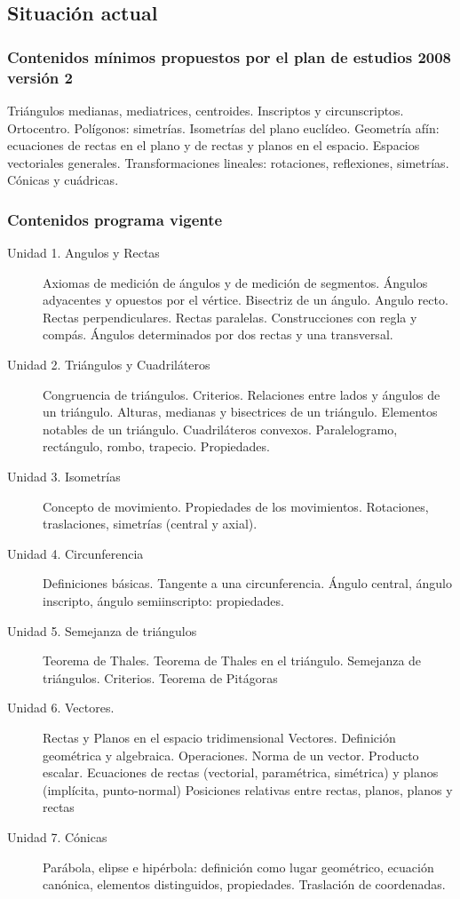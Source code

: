 \documentclass[a4paper,10pt,BCOR10mm,oneside,headsepline]{scrbook}
\begin{document}
\subsection{Situación actual}

\subsubsection{Contenidos mínimos propuestos por el plan de estudios 2008 versión 2}

Triángulos medianas, mediatrices, centroides. Inscriptos y
circunscriptos. Ortocentro. Polígonos: simetrías. Isometrías del
plano euclídeo. Geometría afín: ecuaciones de rectas  en
el plano y de rectas y planos en el espacio. Espacios vectoriales generales.
Transformaciones lineales: rotaciones, reflexiones, simetrías.
Cónicas y cuádricas.

\subsubsection{Contenidos programa vigente}

\begin{description}
 \item[Unidad 1. Angulos y Rectas]
Axiomas de medición de ángulos y de medición de segmentos. Ángulos
adyacentes y opuestos por el vértice. Bisectriz de un ángulo. Angulo recto.
Rectas perpendiculares. Rectas paralelas. Construcciones con regla y
compás. Ángulos determinados por dos rectas y una transversal.

 \item[Unidad 2. Triángulos y Cuadriláteros]
Congruencia de triángulos. Criterios. Relaciones entre lados y ángulos de
un triángulo.
Alturas, medianas y bisectrices de un triángulo. Elementos notables de un
triángulo.
Cuadriláteros convexos. Paralelogramo, rectángulo, rombo, trapecio.
Propiedades.

 \item[Unidad 3. Isometrías]
Concepto de movimiento. Propiedades de los movimientos. Rotaciones,
traslaciones, simetrías (central y axial).

 \item[Unidad 4. Circunferencia]
Definiciones básicas. Tangente a una circunferencia. Ángulo central,
ángulo inscripto, ángulo semiinscripto: propiedades.

 \item[Unidad 5. Semejanza de triángulos]
Teorema de Thales. Teorema de Thales en el triángulo. Semejanza de
triángulos. Criterios. Teorema de Pitágoras

 \item[Unidad 6. Vectores.] Rectas y Planos en el espacio tridimensional
Vectores. Definición geométrica y algebraica. Operaciones. Norma de un
vector. Producto escalar. Ecuaciones de rectas (vectorial, paramétrica,
simétrica) y planos (implícita, punto-normal) Posiciones relativas entre
rectas, planos, planos y rectas

\item[Unidad 7. Cónicas]
Parábola, elipse e hipérbola: definición como lugar geométrico, ecuación
canónica, elementos distinguidos, propiedades. Traslación de
coordenadas.
\end{description}
\end{document}
